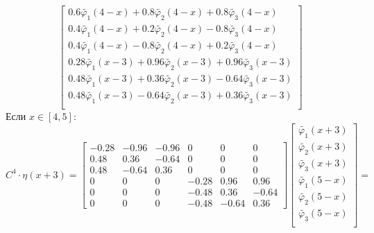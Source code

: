 \documentclass[a4paper, 12pt,fleqn]{extarticle}
\begin{document}
        \[
            \begin{bmatrix}
                0.6 \tilde{\varphi_1}(4-x)  + 0.8 \tilde{\varphi_2}(4-x)+ 0.8 \tilde{\varphi_3}(4-x) \\
                0.4 \tilde{\varphi_1}(4-x) + 0.2 \tilde{\varphi_2}(4-x) - 0.8 \tilde{\varphi_3}(4-x) \\
                0.4 \tilde{\varphi_1}(4-x) - 0.8 \tilde{\varphi_2}(4-x) + 0.2 \tilde{\varphi_3}(4-x) \\
                0.28 \tilde{\varphi_1}(x-3) + 0.96 \tilde{\varphi_2}(x-3) + 0.96 \tilde{\varphi_3}(x-3) \\
                0.48 \tilde{\varphi_1}(x-3) + 0.36 \tilde{\varphi_2}(x-3) - 0.64 \tilde{\varphi_3}(x-3) \\
                0.48 \tilde{\varphi_1}(x-3) - 0.64 \tilde{\varphi_2}(x-3) + 0.36 \tilde{\varphi_3}(x-3) \\
            \end{bmatrix}
            \]
            Если $x \in [4,5]$:
            \[C^4\cdot\eta(x+3)=
            \begin{bmatrix}
                -0.28 & -0.96 & -0.96 & 0 & 0 & 0\\
                0.48 & 0.36 & -0.64 & 0 & 0 & 0\\
                0.48 & -0.64 & 0.36 & 0 & 0 & 0\\
                0 & 0 & 0 & -0.28 & 0.96 & 0.96\\
                0 & 0 & 0 & -0.48 & 0.36 & -0.64\\
                0 & 0 & 0 & -0.48 & -0.64 & 0.36  
            \end{bmatrix}
            \begin{bmatrix}
                \tilde{\varphi_1}(x+3)\\%
                \tilde{\varphi_2}(x+3)\\%
                \tilde{\varphi_3}(x+3)\\%
                \tilde{\varphi_1}(5-x)\\%
                \tilde{\varphi_2}(5-x)\\%
                \tilde{\varphi_3}(5-x)\\%
            \end{bmatrix}=
            \]
\end{document}
